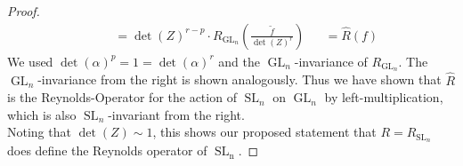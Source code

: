 \begin{proof}
\begin{equation}
\begin{aligned}
      &&&= \operatorname{det} (Z)^{r-p} \cdot R_{\operatorname{GL}_n} \left( \frac{ \tilde{f} }{ \operatorname{det} (Z)^r } \right)
      &&= \hat{R} (f)
    \end{aligned}
  \end{equation}
  We used $ \operatorname{det} (\alpha)^p = 1 = \operatorname{det} (\alpha)^r $ and the $\operatorname{GL}_n$-invariance of $R_{\operatorname{GL}_n}$.
  The $\operatorname{GL}_n$-invariance from the right is shown analogously.
  Thus we have shown that $\hat{R}$ is the Reynolds-Operator for the action of $\operatorname{SL}_n$ on $\operatorname{GL}_n$ by left-multiplication, which is also $\operatorname{SL}_n$-invariant from the right.\\
  Noting that $ \operatorname{det} (Z) \sim 1 $, this shows our proposed statement that $ R = R_{\operatorname{SL}_n} $ does define the Reynolds operator of $\operatorname{\operatorname{SL}_n}$.
\end{proof}

